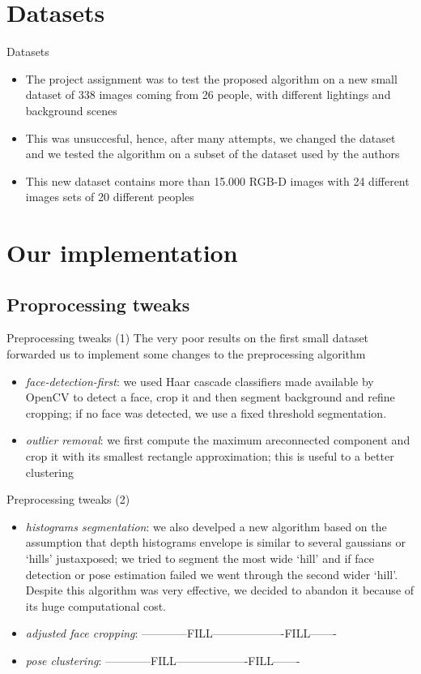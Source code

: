 \documentclass{beamer}
\begin{document}
\section{Datasets}
\begin{frame}{Datasets}
	\begin{itemize}
		\item The project assignment was to test the proposed algorithm
			on a new small dataset of 338 images coming from 26
			people, with different lightings and background scenes
		\item This was unsuccesful, hence, after many attempts, we
			changed the dataset and we tested the algorithm on a
			subset of the dataset used by the authors
		\item This new dataset contains more than 15.000 RGB-D images
			with 24 different images sets of 20 different peoples
	\end{itemize}
\end{frame}

\section{Our implementation}
\subsection{Proprocessing tweaks}
\begin{frame}{Preprocessing tweaks (1)}
	The very poor results on the first small dataset
	forwarded us to implement some changes to the
	preprocessing algorithm
	\begin{itemize}
		\item \textit{face-detection-first}: we used Haar cascade
			classifiers made available by OpenCV to detect a face,
			crop it and then segment background and refine
			cropping; if no face was detected, we use a fixed
			threshold segmentation.
		\item \textit{outlier removal}: we first compute the maximum
			areconnected component and crop it with its smallest
			rectangle approximation; this is useful to a better
			clustering
	\end{itemize}
\end{frame}

\begin{frame}{Preprocessing tweaks (2)}
	\begin{itemize}
		\item \textit{histograms segmentation}: we also develped a new
			algorithm based on the assumption that depth histograms
			envelope is similar to several gaussians or `hills'
			justaxposed; we tried to segment the most wide `hill'
			and if face detection or pose estimation failed we went
			through the second wider `hill'. Despite this algorithm
			was very effective, we decided to abandon it because of
			its huge computational cost.
		\item \textit{adjusted face cropping}:
			------------FILL-------------------FILL-------
		\item \textit{pose clustering}:
			------------FILL-------------------FILL-------
	\end{itemize}
\end{frame}
\end{document}
